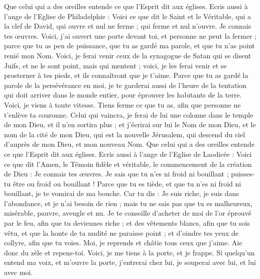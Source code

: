 \begin{multicols}{2}
Que celui qui a des oreilles entende ce que l'Esprit dit aux églises.
Ecris aussi à l'ange de l'Eglise de Philadelphie : Voici ce que dit le Saint et le Véritable, qui a la clef de David, qui ouvre et nul ne ferme ; qui ferme et nul n'ouvre.
Je connais tes œuvres. Voici, j’ai ouvert une porte devant toi, et personne ne peut la fermer ; parce que tu as peu de puissance, que tu as gardé ma parole, et que tu n'as point renié mon Nom.
Voici, je ferai venir ceux de la synagogue de Satan qui se disent Juifs, et ne le sont point, mais qui mentent ; voici, je les ferai venir et se prosterner à tes pieds, et ils connaîtront que je t'aime.
Parce que tu as gardé la parole de la persévérance en moi, je te garderai aussi de l'heure de la tentation qui doit arriver dans le monde entier, pour éprouver les habitants de la terre.
Voici, je viens à toute vitesse. Tiens ferme ce que tu as, afin que personne ne t'enlève ta couronne.
Celui qui vaincra, je ferai de lui une colonne dans le temple de mon Dieu, et il n'en sortira plus ; et j'écrirai sur lui le Nom de mon Dieu, et le nom de la cité de mon Dieu, qui est la nouvelle Jérusalem, qui descend du ciel d’auprès de mon Dieu, et mon nouveau Nom.
Que celui qui a des oreilles entende ce que l'Esprit dit aux églises.
Ecris aussi à l'ange de l'Eglise de Laodicée : Voici ce que dit l'Amen, le Témoin fidèle et véritable, le commencement de la création de Dieu :
Je connais tes œuvres. Je sais que tu n'es ni froid ni bouillant ; puisses-tu être ou froid ou bouillant !
Parce que tu es tiède, et que tu n'es ni froid ni bouillant, je te vomirai de ma bouche.
Car tu dis : Je suis riche, je suis dans l'abondance, et je n'ai besoin de rien ; mais tu ne sais pas que tu es malheureux, misérable, pauvre, aveugle et nu.
Je te conseille d'acheter de moi de l'or éprouvé par le feu, afin que tu deviennes riche ; et des vêtements blancs, afin que tu sois vêtu, et que la honte de ta nudité ne paraisse point ; et d'oindre tes yeux de collyre, afin que tu voies.
Moi, je reprends et châtie tous ceux que j'aime. Aie donc du zèle et repens-toi.
Voici, je me tiens à la porte, et je frappe. Si quelqu'un entend ma voix, et m'ouvre la porte, j'entrerai chez lui, je souperai avec lui, et lui avec moi.

\end{multicols}
